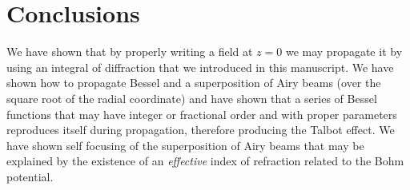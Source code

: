\documentclass[aps,pra,reprint,superscriptaddress]{revtex4-2}
\begin{document}
\section{Conclusions}  We have shown that by properly writing a field at $z=0$ we may propagate it by using an integral of diffraction that we introduced in this manuscript. We have shown how to propagate Bessel and a superposition of Airy beams (over the square root of the radial coordinate) and have shown that a series of Bessel functions that may have integer or fractional order  and with proper parameters reproduces itself during propagation, therefore producing the Talbot effect. We have shown self focusing of the superposition of Airy beams that may be explained by the existence of an {\it effective} index of refraction related to the Bohm potential. 
%
\begin{thebibliography}{9}


\end{thebibliography}
\end{document}
